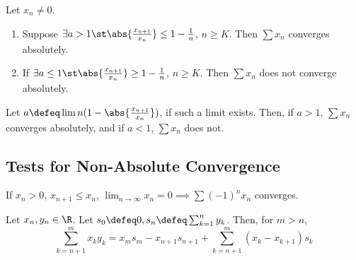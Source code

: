 \begin{proposition}
    Let $x_n \neq 0$. 
    \begin{enumerate}
        \item Suppose $\exists a > 1 \st \abs{\frac{x_{n+1}}{x_n}} \leq 1 - \frac{1}{n}$, $n \geq K$. Then $\sum x_n$ converges absolutely.
        \item If $\exists a \leq 1 \st \abs{\frac{x_{n+1}}{x_n}} \geq 1 - \frac{1}{n}$, $n \geq K$. Then $\sum x_n$ does not converge absolutely.
    \end{enumerate}
\end{proposition}

\begin{corollary}
    Let $a \defeq \lim n(1 - \abs{\frac{x_{n+1}}{x_n}})$, if such a limit exists. Then, if $a > 1$, $\sum x_n$ converges absolutely, and if $a < 1$, $\sum x_n$ does not.
\end{corollary}

\subsection{Tests for Non-Absolute Convergence}
\begin{proposition}
    If $x_n > 0$, $x_{n+1} \leq x_n$, $\lim_{n \to \infty} x_n = 0 \implies \sum (-1)^n x_n$ converges.
\end{proposition}

\begin{lemma}
    Let $x_n,y_n \in \R$. Let $s_0 \defeq 0, s_n \defeq \sum_{k=1}^n y_k$. Then, for $m > n$, \[
    \sum_{k=n+1}^m x_k y_k = x_m s_m - x_{n+1} s_{n+1}     + \sum_{k=n+1}^m (x_k - x_{k+1}) s_k
    \]
\end{lemma}